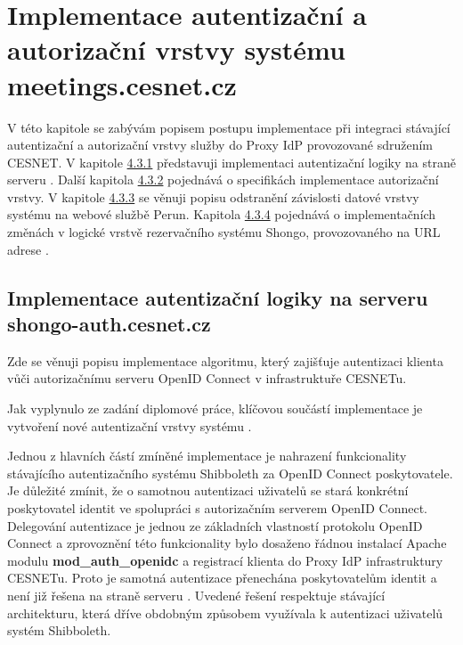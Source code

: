 \documentclass[
  printed, %
  twoside, %
  table,   %
  nolof,     %
  nolot,     %
]{fithesis3}
\begin{document}
\section[Implementace autentizační a autorizační vrstvy systému\break meetings.cesnet.cz]{Implementace autentizační a autorizační vrstvy systému meetings.cesnet.cz}
\label{ShongoImpl}
V této kapitole se zabývám popisem postupu implementace při integraci stávající autentizační a autorizační vrstvy služby  do Proxy IdP provozované sdružením CESNET. V kapitole \hyperref[ShongoImpl-authn]{4.3.1} představuji implementaci autentizační logiky na straně serveru . Další kapitola \hyperref[ShongoImpl-authr]{4.3.2} pojednává o specifikách implementace autorizační vrstvy. V kapitole \hyperref[zpracovaniAUlozeniPerun]{4.3.3} se věnuji popisu odstranění závislosti datové vrstvy systému  na webové službě Perun. Kapitola \hyperref[ShongoImpl-web]{4.3.4} pojednává o implementačních změnách v logické vrstvě rezervačního systému Shongo, provozovaného na URL adrese . 

\subsection{Implementace autentizační logiky na serveru shongo-auth.cesnet.cz}
\label{ShongoImpl-authn}    

Zde se věnuji popisu implementace algoritmu, který zajišťuje autentizaci klienta  vůči autorizačnímu serveru OpenID Connect v infrastruktuře CESNETu.  

\par

Jak vyplynulo ze zadání diplomové práce, klíčovou součástí implementace je vytvoření nové autentizační vrstvy systému .
\par

Jednou z hlavních částí zmíněné implementace je nahrazení funkcionality stávajícího autentizačního systému Shibboleth za OpenID Connect poskytovatele.
Je důležité zmínit, že o samotnou autentizaci uživatelů se stará konkrétní poskytovatel identit ve spolupráci s autorizačním serverem OpenID Connect. Delegování autentizace je jednou ze základních vlastností protokolu OpenID Connect a zprovoznění této funkcionality bylo dosaženo řádnou instalací Apache modulu \textbf{mod\_auth\_openidc} a registrací klienta  do Proxy IdP infrastruktury CESNETu. Proto je samotná autentizace přenechána poskytovatelům identit a není již řešena na straně serveru . Uvedené řešení respektuje stávající architekturu, která dříve obdobným způsobem využívala k autentizaci uživatelů systém Shibboleth. 
\end{document}
